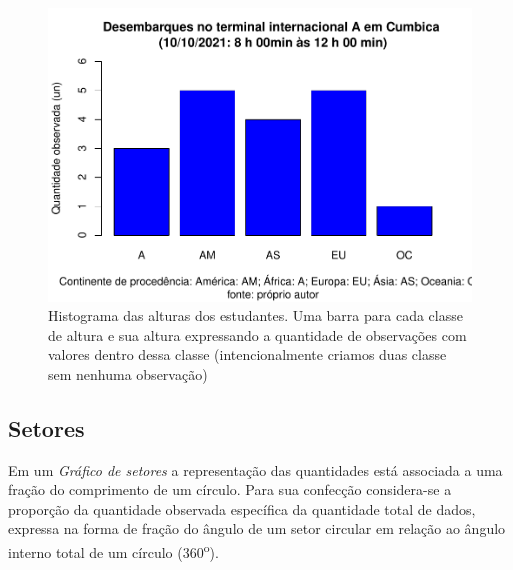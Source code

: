 \documentclass[
]{book}
\begin{document}
\begin{figure}
\centering
\includegraphics{apostila_files/figure-latex/unnamed-chunk-52-1.pdf}
\caption{\label{fig:unnamed-chunk-52}Histograma das alturas dos estudantes. Uma barra para cada classe de altura e sua altura expressando a quantidade de observações com valores dentro dessa classe (intencionalmente criamos duas classe sem nenhuma observação)}
\end{figure}

\hypertarget{setores}{%
\subsection{Setores}\label{setores}}

Em um \emph{Gráfico de setores} a representação das quantidades está associada a uma fração do comprimento de um círculo. Para sua confecção considera-se a proporção da quantidade observada específica da quantidade total de dados, expressa na forma de fração do ângulo de um setor circular em relação ao ângulo interno total de um círculo (360\textsuperscript{o}).
\end{document}
